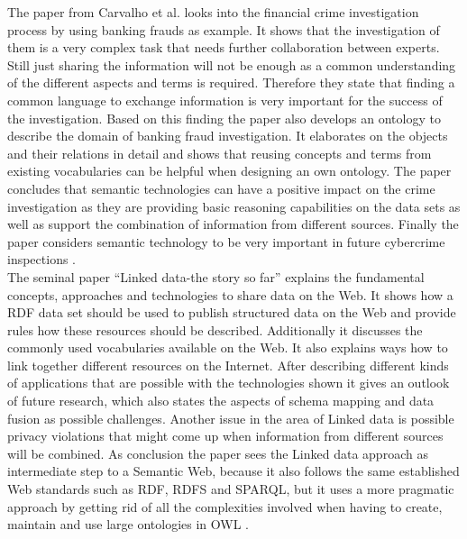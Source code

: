 The paper from Carvalho et al. looks into the financial crime investigation process by using banking frauds as example. It shows that the investigation of them is a very complex task that needs further collaboration between experts. Still just sharing the information will not be enough as a common understanding of the different aspects and terms is required. Therefore they state that finding a common language to exchange information is very important for the success of the investigation. Based on this finding the paper also develops an ontology to describe the domain of banking fraud investigation. It elaborates on the objects and their relations in detail and shows that reusing concepts and terms from existing vocabularies can be helpful when designing an own ontology. The paper concludes that semantic technologies can have a positive impact on the crime investigation as they are providing basic reasoning capabilities on the data sets as well as support the combination of information from different sources. Finally the paper considers semantic technology to be very important in future cybercrime inspections \citep{carvalhoapplying}. \\

The seminal paper ``Linked data-the story so far'' explains the fundamental concepts, approaches and technologies to share data on the Web. It shows how a \gls{RDF} data set should be used to publish structured data on the Web and provide rules how these resources should be described. Additionally it discusses the commonly used vocabularies available on the Web. It also explains ways how to link together different resources on the Internet. After describing different kinds of applications that are possible with the technologies shown it gives an outlook of future research, which also states the aspects of schema mapping and data fusion as possible challenges. Another issue in the area of Linked data is possible privacy violations that might come up when information from different sources will be combined. As conclusion the paper sees the Linked data approach as intermediate step to a Semantic Web, because it also follows the same established Web standards such as \gls{RDF}, \gls{RDFS} and \gls{SPARQL}, but it uses a more pragmatic approach by getting rid of all the complexities involved when having to create, maintain and use large ontologies in \gls{OWL} \citep{bizer2009linked}. \\

